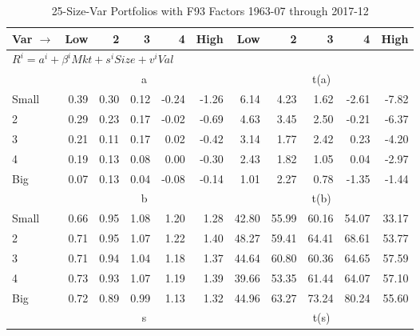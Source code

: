 
\begin{table}[!ht]
\footnotesize
\centering
\caption{25-Size-Var Portfolios with F93 Factors 1963-07 through 2017-12}
\begin{tabular}{lrrrrrrrrrr}
  \toprule
    Var $\rightarrow$ & Low & 2 & 3 & 4 & High & Low & 2 & 3 & 4 & High \\ 
  \midrule
  \multicolumn{11}{l}{$R^i=a^i+\beta^iMkt+s^iSize+v^iVal$} \\

  
    
      & \multicolumn{5}{c}{a} & \multicolumn{5}{c}{t(a)}
    
    \\
      \cmidrule(r){2-6} \cmidrule(r){7-11}

    Small   & 0.39  & 0.30  & 0.12  & -0.24  & -1.26  & 6.14  & 4.23  & 1.62  & -2.61  & -7.82  \\
         2  & 0.29  & 0.23  & 0.17  & -0.02  & -0.69  & 4.63  & 3.45  & 2.50  & -0.21  & -6.37  \\
         3  & 0.21  & 0.11  & 0.17  & 0.02  & -0.42  & 3.14  & 1.77  & 2.42  & 0.23  & -4.20  \\
         4  & 0.19  & 0.13  & 0.08  & 0.00  & -0.30  & 2.43  & 1.82  & 1.05  & 0.04  & -2.97  \\
    Big     & 0.07  & 0.13  & 0.04  & -0.08  & -0.14  & 1.01  & 2.27  & 0.78  & -1.35  & -1.44  \\

  
    
      & \multicolumn{5}{c}{b} & \multicolumn{5}{c}{t(b)}
    
    \\
      \cmidrule(r){2-6} \cmidrule(r){7-11}

    Small   & 0.66  & 0.95  & 1.08  & 1.20  & 1.28  & 42.80  & 55.99  & 60.16  & 54.07  & 33.17  \\
         2  & 0.71  & 0.95  & 1.07  & 1.22  & 1.40  & 48.27  & 59.41  & 64.41  & 68.61  & 53.77  \\
         3  & 0.71  & 0.94  & 1.04  & 1.18  & 1.37  & 44.64  & 60.80  & 60.36  & 64.65  & 57.59  \\
         4  & 0.73  & 0.93  & 1.07  & 1.19  & 1.39  & 39.66  & 53.35  & 61.44  & 64.07  & 57.10  \\
    Big     & 0.72  & 0.89  & 0.99  & 1.13  & 1.32  & 44.96  & 63.27  & 73.24  & 80.24  & 55.60  \\

  
    
      & \multicolumn{5}{c}{s} & \multicolumn{5}{c}{t(s)}
    

\end{tabular}
\end{table}
